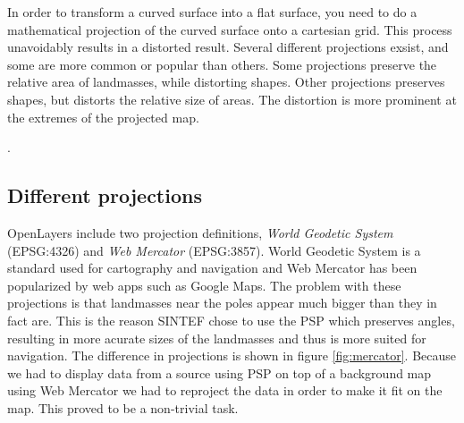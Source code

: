 \documentclass[11pt,a4paper,titlepage,oneside]{report}
\begin{document}
In order to transform a curved surface into a flat surface, you need to do a mathematical projection of the curved surface onto a cartesian grid.
This process unavoidably results in a distorted result. Several different projections exsist, and some are more common or popular than others.
Some projections preserve the relative area of landmasses, while distorting shapes. Other projections preserves shapes, but distorts the relative size of areas. The distortion is more prominent at the extremes of the projected map.

\cite{mapProjections}.

\subsection{Different projections}
OpenLayers include two projection definitions, \textit{World Geodetic System} (EPSG:4326) and \textit{Web Mercator} (EPSG:3857). World Geodetic System is a standard used for cartography and navigation and Web Mercator has been popularized by web apps such as Google Maps. The problem with these projections is that landmasses near the poles appear much bigger than they in fact are.
This is the reason SINTEF chose to use the \gls{PSP} which preserves angles, resulting in more acurate sizes of the landmasses and thus is more suited for navigation. The difference in projections is shown in figure \ref{fig:mercator}.
Because we had to display data from a source using \gls{PSP} on top of a background map using Web Mercator we had to reproject the data in order to make it fit on the map. This proved to be a non-trivial task. 
\end{document}
